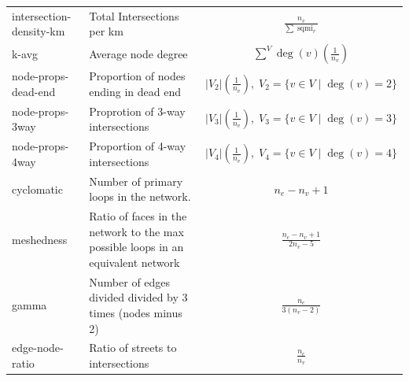 \documentclass[
  10pt,
]{article}
\begin{document}
\begin{longtable}{l|p{6cm}|c}
intersection-density-km &                                                       Total Intersections per km &                                                                            $\frac{n_v}{\sum{\operatorname{sqmi}_r}}$ \\
                  k-avg &                                                              Average node degree &                                                                                   $ \sum^V{\deg(v)} (\frac{1}{n_v})$ \\
    node-props-dead-end &                                           Proportion of nodes ending in dead end &                                $ \vert V_2 \vert \left( \frac{ 1}{n_v} \right) ,\;  V_2= \{v\in V \mid \deg(v)=2 \}$ \\
        node-props-3way &                                                Proprotion of 3-way intersections &                                  $ \vert V_3 \vert  \left(\frac{1}{n_v} \right),\;  V_3= \{v\in V \mid \deg(v)=3 \}$ \\
        node-props-4way &                                                Proportion of 4-way intersections &                                 $  \vert V_4 \vert \left(\frac{1 }{n_v} \right),\;  V_4= \{v\in V \mid \deg(v)=4 \}$ \\
             cyclomatic &                                          Number of primary loops in the network. &                                                                                                              $n_e-n_v+1$ \\
             meshedness & Ratio of faces in the network to the max possible loops in an equivalent network &                                                                                                 $\frac{n_e-n_v+1}{2n_v-5}$ \\
                  gamma &                      Number of edges divided divided by 3 times (nodes minus 2)  &                                                                                                  $\frac{n_e}{3(n_v-2)} $ \\
        edge-node-ratio &                                                Ratio of streets to intersections &                                                                                                    $\frac{n_e}{n_v}$ \\
\end{longtable}
\end{document}
